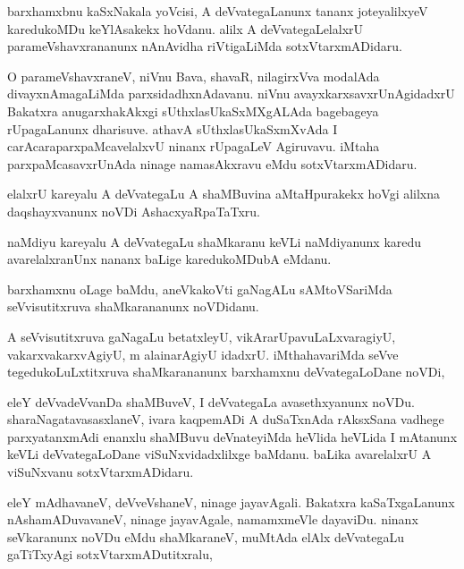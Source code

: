 \documentclass{article}
\begin{document}
\begin{mn}%
barxhamxbnu kaSxNakala yoVcisi, A deVvategaLanunx tananx joteyalilxyeV karedukoMDu 
keYlAsakekx hoVdanu. alilx A deVvategaLelalxrU parameVshavxrananunx nAnAvidha riVtigaLiMda 
sotxVtarxmADidaru.
\end{mn}

\begin{mn}%
O parameVshavxraneV, niVnu Bava, shavaR, nilagirxVva modalAda divayxnAmagaLiMda 
parxsidadhxnAdavanu. niVnu avayxkarxsavxrUnAgidadxrU Bakatxra anugarxhakAkxgi 
sUthxlasUkaSxMXgALAda bagebageya rUpagaLanunx dharisuve. athavA sUthxlasUkaSxmXvAda I 
carAcaraparxpaMcavelalxvU ninanx rUpagaLeV Agiruvavu. iMtaha parxpaMcasavxrUnAda ninage 
namasAkxravu eMdu sotxVtarxmADidaru.
\end{mn}

\begin{mn}%
elalxrU kareyalu A deVvategaLu A shaMBuvina aMtaHpurakekx hoVgi alilxna daqshayxvanunx 
noVDi AshacxyaRpaTaTxru.
\end{mn}

\begin{mn}%
naMdiyu kareyalu A deVvategaLu shaMkaranu keVLi naMdiyanunx karedu avarelalxranUnx nananx 
baLige karedukoMDubA eMdanu.
\end{mn}

\begin{mn}%
barxhamxnu oLage baMdu, aneVkakoVti gaNagALu sAMtoVSariMda seVvisutitxruva shaMkarananunx 
noVDidanu.
\end{mn}

\begin{mn}%
A seVvisutitxruva gaNagaLu betatxleyU, vikArarUpavuLaLxvaragiyU, vakarxvakarxvAgiyU, m 
alainarAgiyU idadxrU. iMthahavariMda seVve tegedukoLuLxtitxruva shaMkarananunx barxhamxnu 
deVvategaLoDane noVDi,
\end{mn}

\begin{mn}%
eleY deVvadeVvanDa shaMBuveV, I deVvategaLa avasethxyanunx noVDu. sharaNagatavasasxlaneV, 
ivara kaqpemADi A duSaTxnAda rAksxSana vadhege parxyatanxmAdi enanxlu shaMBuvu 
deVnateyiMda heVlida heVLida I mAtanunx keVLi deVvategaLoDane viSuNxvidadxlilxge baMdanu. 
baLika avarelalxrU A viSuNxvanu sotxVtarxmADidaru.
\end{mn}

\begin{mn}%
eleY mAdhavaneV, deVveVshaneV, ninage jayavAgali. Bakatxra kaSaTxgaLanunx 
nAshamADuvavaneV, ninage jayavAgale, namamxmeVle dayaviDu. ninanx seVkaranunx noVDu eMdu 
shaMkaraneV, muMtAda elAlx deVvategaLu gaTiTxyAgi sotxVtarxmADutitxralu,
\end{mn}
\end{document}
